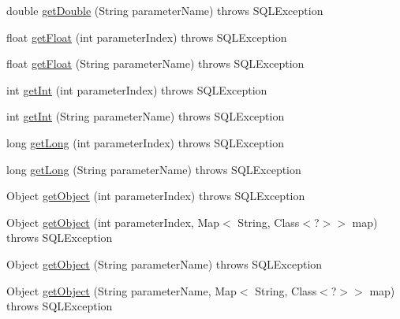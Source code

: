 \begin{DoxyCompactItemize}
double \mbox{\hyperlink{classcom_1_1mysql_1_1jdbc_1_1_callable_statement_ae37344036d51a7e4fa8c2b9fa114a5e3}{get\+Double}} (String parameter\+Name)  throws S\+Q\+L\+Exception 
\item 
float \mbox{\hyperlink{classcom_1_1mysql_1_1jdbc_1_1_callable_statement_a8d46288adf1ec4d20ec7b7a81cd94b58}{get\+Float}} (int parameter\+Index)  throws S\+Q\+L\+Exception 
\item 
float \mbox{\hyperlink{classcom_1_1mysql_1_1jdbc_1_1_callable_statement_ad843b9b8fcff654bb2cfb548437624e0}{get\+Float}} (String parameter\+Name)  throws S\+Q\+L\+Exception 
\item 
int \mbox{\hyperlink{classcom_1_1mysql_1_1jdbc_1_1_callable_statement_a43b66c9bcf8be39ba1d4b5a05fbbfc0f}{get\+Int}} (int parameter\+Index)  throws S\+Q\+L\+Exception 
\item 
int \mbox{\hyperlink{classcom_1_1mysql_1_1jdbc_1_1_callable_statement_a73f5f0d0b8156cf0ad5f9cf4840761d7}{get\+Int}} (String parameter\+Name)  throws S\+Q\+L\+Exception 
\item 
long \mbox{\hyperlink{classcom_1_1mysql_1_1jdbc_1_1_callable_statement_a7e0a085c7abe35479c63872335ac6f8f}{get\+Long}} (int parameter\+Index)  throws S\+Q\+L\+Exception 
\item 
long \mbox{\hyperlink{classcom_1_1mysql_1_1jdbc_1_1_callable_statement_a71fe668a8e85c9a07c6f66d80edbff88}{get\+Long}} (String parameter\+Name)  throws S\+Q\+L\+Exception 
\item 
Object \mbox{\hyperlink{classcom_1_1mysql_1_1jdbc_1_1_callable_statement_aab2faed459ce07e17b7c4c6871d7ffb4}{get\+Object}} (int parameter\+Index)  throws S\+Q\+L\+Exception 
\item 
Object \mbox{\hyperlink{classcom_1_1mysql_1_1jdbc_1_1_callable_statement_a5a628d28a025afcd44718d58d26e6c05}{get\+Object}} (int parameter\+Index, Map$<$ String, Class$<$?$>$$>$ map)  throws S\+Q\+L\+Exception 
\item 
Object \mbox{\hyperlink{classcom_1_1mysql_1_1jdbc_1_1_callable_statement_ab02d94c34e2da9319a2b5a8256a20713}{get\+Object}} (String parameter\+Name)  throws S\+Q\+L\+Exception 
\item 
Object \mbox{\hyperlink{classcom_1_1mysql_1_1jdbc_1_1_callable_statement_ac622bfc97a9ee7a1a3658629d2f5d425}{get\+Object}} (String parameter\+Name, Map$<$ String, Class$<$?$>$$>$ map)  throws S\+Q\+L\+Exception 
\item 
\mbox{\label{classcom_1_1mysql_1_1jdbc_1_1_callable_statement_a3390fe1e80adf6bad9326e046265a164}} 

\end{DoxyCompactItemize}
